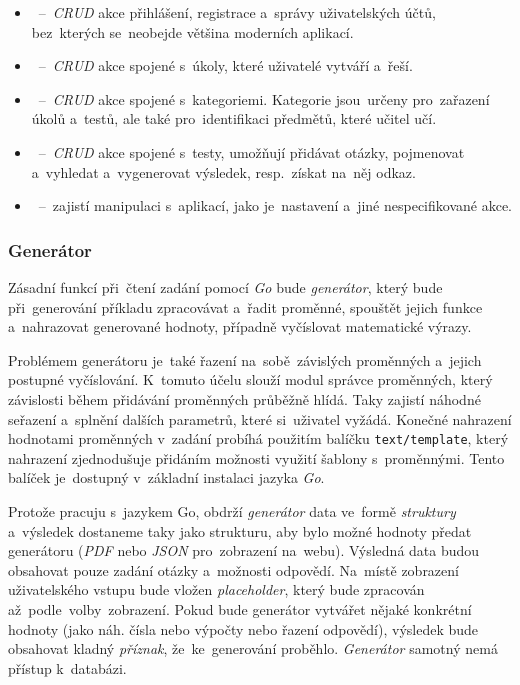 \documentclass[10pt,a4paper]{article}
\newcommand{\harddata}[1]{\boxed{\texttt{#1}}}
\begin{document}
            \begin{itemize}
                \item \harddata{User}~--~\emph{CRUD} akce přihlášení, registrace a~správy uživatelských účtů, bez~kterých se~neobejde většina moderních aplikací.
                \item \harddata{Task}~--~\emph{CRUD} akce spojené s~úkoly, které uživatelé vytváří a~řeší.
                \item \harddata{Category}~--~\emph{CRUD} akce spojené s~kategoriemi. Kategorie jsou~určeny pro~zařazení úkolů a~testů, ale také pro~identifikaci předmětů, které učitel učí.
                \item \harddata{Test}~--~\emph{CRUD} akce spojené s~testy, umožňují přidávat otázky, pojmenovat a~vyhledat a~vygenerovat výsledek, resp.~získat na~něj odkaz.
                \item \harddata{App}~--~zajistí manipulaci s~aplikací, jako je~nastavení a~jiné nespecifikované akce.
            \end{itemize}

            \subsubsection{Generátor}
            Zásadní funkcí při~čtení zadání pomocí \emph{Go} bude \emph{generátor}, který bude při~generování příkladu zpracovávat a~řadit proměnné, spouštět jejich funkce a~nahrazovat generované hodnoty, případně vyčíslovat matematické výrazy.
            
            Problémem generátoru je~také řazení na~sobě~závislých proměnných a~jejich postupné vyčíslování. K~tomuto účelu slouží modul správce proměnných, který závislosti během přidávání proměnných průběžně hlídá. Taky zajistí náhodné seřazení a~splnění dalších parametrů, které si~uživatel vyžádá. Konečné nahrazení hodnotami proměnných v~zadání probíhá použitím balíčku \texttt{text/template}, který nahrazení zjednodušuje přidáním možnosti využití šablony s~proměnnými. Tento balíček je~dostupný v~základní instalaci jazyka \emph{Go}.

            Protože pracuju s~jazykem Go, obdrží \emph{generátor} data ve~formě \emph{struktury} a~výsledek dostaneme taky jako strukturu, aby bylo možné hodnoty předat generátoru (\emph{PDF} nebo \emph{JSON} pro~zobrazení na~webu). Výsledná data budou obsahovat pouze zadání otázky a~možnosti odpovědí. Na~místě zobrazení uživatelského vstupu bude vložen \emph{placeholder}, který bude zpracován až~podle~volby~zobrazení. Pokud bude generátor vytvářet nějaké konkrétní hodnoty (jako náh. čísla nebo výpočty nebo řazení odpovědí), výsledek bude obsahovat kladný \emph{příznak}, že~ke~generování proběhlo. \emph{Generátor} samotný nemá přístup k~databázi.
\end{document}
